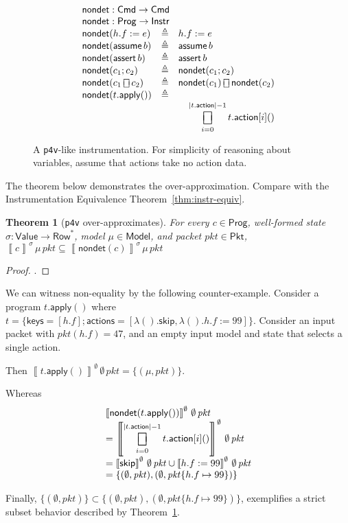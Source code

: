 \documentclass{article}
\newcommand{\pkt}{\mathit{pkt}}
\newcommand{\denote}[1]{\left\llbracket#1\right\rrbracket}
\newcommand{\Value}{\mathsf{Value}}
\newcommand{\Cmd}{\mathsf{Cmd}}
\newcommand{\Instr}{\mathsf{Instr}}
\newcommand{\Prog}{\mathsf{Prog}}
\newcommand{\Pkt}{\mathsf{Pkt}}
\newcommand{\Model}{\mathsf{Model}}
\newcommand{\Row}{\mathsf{Row}}
\newcommand{\action}{\mathsf{action}}
\newcommand{\actions}{\mathsf{actions}}
\newcommand{\keys}{\mathsf{keys}}
\newcommand{\assert}{\mathop{\mathsf{assert}}}
\newcommand{\assume}{\mathop{\mathsf{assume}}}
\newcommand{\apply}{\mathsf{apply}}
\newcommand{\choiceop}{\rotatebox[origin=c]{90}{$\sqsubset\!\!\!\sqsupset$}}
\newcommand{\choice}{\mathbin{\choiceop}}
\DeclareMathOperator*{\bigchoice}{\scalerel*{\choiceop}{\sum}}
\newcommand{\SKIP}{\mathsf{skip}}
\newcommand{\nondet}{\mathsf{nondet}}
\newtheorem{theorem}{Theorem}
\begin{document}
\begin{figure}
  \[\begin{array}{l >{\triangleq}cl}
  \multicolumn{3}{l}{\nondet : \Cmd \to \Cmd} \\
  \multicolumn{3}{l}{\nondet : \Prog \to \Instr} \\
  \nondet(h.f := e) && h.f := e \\
  \nondet(\assume b) && \assume b \\
  \nondet(\assert b) && \assert b \\
  \nondet(c_1;c_2) && \nondet(c_1;c_2) \\
  \nondet(c_1 \choice c_2) && \nondet(c_1) \choice \nondet(c_2) \\
  \nondet(t.\apply()) && \\
  \multicolumn{3}{>{\qquad}r}{
    \displaystyle
    \bigchoice_{i = 0}^{|t.\action|-1}t.\action[i]()
  }
  \end{array}\]
  \caption{A \texttt{p4v}-like instrumentation. For simplicity of reasoning
    about variables, assume that actions take no action data. }
  \label{fig:p4vlike}
\end{figure}

The theorem below demonstrates the over-approximation. Compare with the Instrumentation Equivalence Theorem~\ref{thm:instr-equiv}.

\begin{theorem}[\texttt{p4v} over-approximates]
  \label{thm:p4v-over}
  For every $c \in \Prog$, well-formed state $\sigma : \Value \to \Row^* $,
  model $\mu \in \Model$, and packet $\pkt \in \Pkt$,
  $\denote{c}^\sigma\,\mu\,\pkt \subseteq \denote{\nondet(c)}^\sigma\,\mu\,\pkt$
\end{theorem}

\begin{proof}
.
\end{proof}

We can witness non-equality by the following counter-example. Consider a program
$t.\apply()$ where $t = \{\keys=[h.f];\actions=[\lambda().\SKIP, \lambda(). h.f :=
  99]\}$. Consider an input packet with $\pkt(h.f) = 47$, and an empty input
model and state that selects a single action.

Then $\denote{t.\apply()}^\emptyset\,\emptyset\,\pkt = \{(\mu,\pkt)\}$.

Whereas
\[\begin{array}{l}
\denote{\nondet(t.\apply())}^\emptyset\,\emptyset\,\pkt \\
= \denote{
    \displaystyle
    \bigchoice_{i = 0}^{|t.\action|-1} t.\action[i]()
}^\emptyset\,\emptyset\,\pkt \\
= \denote{\SKIP}^\emptyset\,\emptyset\,\pkt \cup \denote{h.f := 99}^\emptyset\,\emptyset\,\pkt\\
= \{(\emptyset,\pkt),(\emptyset,\pkt\{h.f\mapsto 99\})\}
\end{array}\]

Finally, $\{(\emptyset,\pkt)\} \subset
\{(\emptyset,\pkt),(\emptyset,\pkt\{h.f\mapsto 99\})\}$, exemplifies a strict
subset behavior described by Theorem~\ref{thm:p4v-over}.
\end{document}
